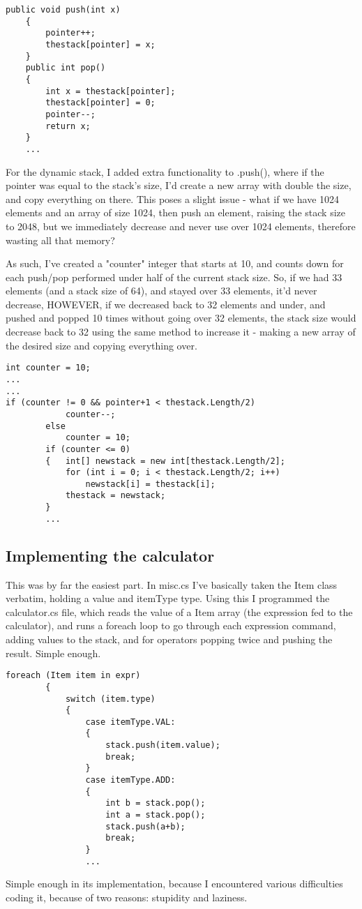 \documentclass{article}
\begin{document}
\begin{lstlisting}[Language = C#]
    public void push(int x)
    {
        pointer++;
        thestack[pointer] = x;
    }
    public int pop()
    {
        int x = thestack[pointer];
        thestack[pointer] = 0;
        pointer--;
        return x;
    }
    ...
\end{lstlisting}

For the dynamic stack, I added extra functionality to .push(), where if the pointer was equal to the stack's size, I'd create a new array with double the size, and copy everything on there. This poses a slight issue - what if we have 1024 elements and an array of size 1024, then push an element, raising the stack size to 2048, but we immediately decrease and never use over 1024 elements, therefore wasting all that memory?

As such, I've created a "counter" integer that starts at 10, and counts down for each push/pop performed under half of the current stack size. So, if we had 33 elements (and a stack size of 64), and stayed over 33 elements, it'd never decrease, HOWEVER, if we decreased back to 32 elements and under, and pushed and popped 10 times without going over 32 elements, the stack size would decrease back to 32 using the same method to increase it - making a new array of the desired size and copying everything over.
\begin{lstlisting}[Language = C#]
int counter = 10;
...
...
if (counter != 0 && pointer+1 < thestack.Length/2)
            counter--;
        else 
            counter = 10;
        if (counter <= 0)
        {   int[] newstack = new int[thestack.Length/2];
            for (int i = 0; i < thestack.Length/2; i++)
                newstack[i] = thestack[i];
            thestack = newstack;
        }
        ...
\end{lstlisting}

\subsection{Implementing the calculator}

This was by far the easiest part. In misc.cs I've basically taken the Item class verbatim, holding a value and itemType type. Using this I programmed the calculator.cs file, which reads the value of a Item array (the expression fed to the calculator), and runs a foreach loop to go through each expression command, adding values to the stack, and for operators popping twice and pushing the result. Simple enough. 
\begin{lstlisting}[Language = C#]
foreach (Item item in expr)
        {
            switch (item.type)
            {
                case itemType.VAL:
                {
                    stack.push(item.value);
                    break;
                }
                case itemType.ADD:
                {
                    int b = stack.pop();
                    int a = stack.pop();
                    stack.push(a+b);
                    break;
                }
                ...
\end{lstlisting}
Simple enough in its implementation, because I encountered various difficulties coding it, because of two reasons: stupidity and laziness.
\end{document}
